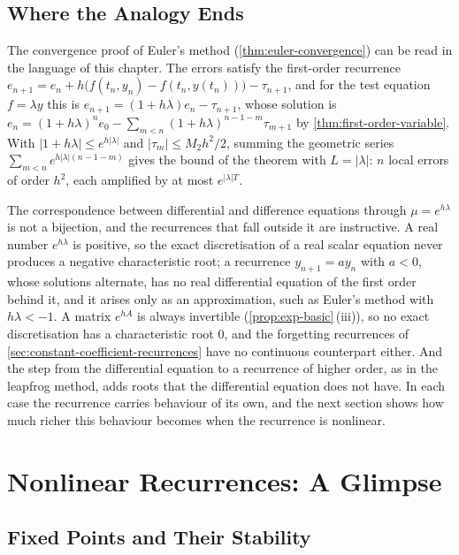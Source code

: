 \subsection{Where the Analogy Ends}

The convergence proof of Euler's method (\cref{thm:euler-convergence}) can be read in the language of this chapter. The errors satisfy the first-order recurrence $e_{n+1}=e_n+h\bigl(f(t_n,y_n)-f(t_n,y(t_n))\bigr)-\tau_{n+1}$, and for the test equation $f=\lambda y$ this is $e_{n+1}=(1+h\lambda)e_n-\tau_{n+1}$, whose solution is $e_n=(1+h\lambda)^ne_0-\sum_{m<n}(1+h\lambda)^{n-1-m}\tau_{m+1}$ by \cref{thm:first-order-variable}. With $|1+h\lambda|\le e^{h|\lambda|}$ and $|\tau_m|\le M_2h^2/2$, summing the geometric series $\sum_{m<n}e^{h|\lambda|(n-1-m)}$ gives the bound of the theorem with $L=|\lambda|$: $n$ local errors of order $h^2$, each amplified by at most $e^{|\lambda|T}$.

The correspondence between differential and difference equations through $\mu=e^{h\lambda}$ is not a bijection, and the recurrences that fall outside it are instructive. A real number $e^{h\lambda}$ is positive, so the exact discretisation of a real scalar equation never produces a negative characteristic root; a recurrence $y_{n+1}=ay_n$ with $a<0$, whose solutions alternate, has no real differential equation of the first order behind it, and it arises only as an approximation, such as Euler's method with $h\lambda<-1$. A matrix $e^{hA}$ is always invertible (\cref{prop:exp-basic}\,(iii)), so no exact discretisation has a characteristic root $0$, and the forgetting recurrences of \cref{sec:constant-coefficient-recurrences} have no continuous counterpart either. And the step from the differential equation to a recurrence of higher order, as in the leapfrog method, adds roots that the differential equation does not have. In each case the recurrence carries behaviour of its own, and the next section shows how much richer this behaviour becomes when the recurrence is nonlinear.

\section{Nonlinear Recurrences: A Glimpse}
\label{sec:nonlinear-recurrences}

\subsection{Fixed Points and Their Stability}

